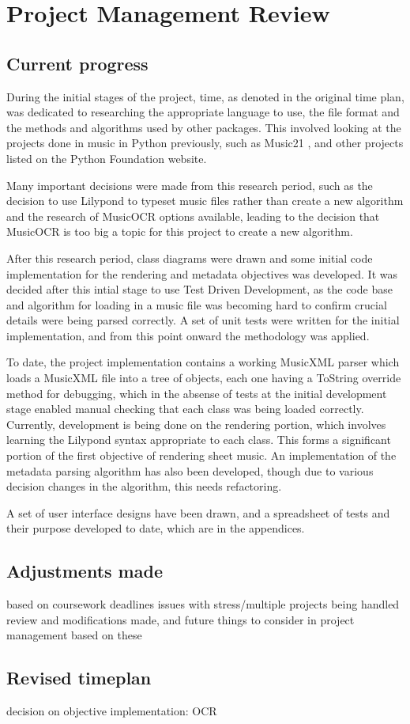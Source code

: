 \section{Project Management Review}
\subsection{Current progress}
During the initial stages of the project, time, as denoted in the original time plan, was dedicated to researching the appropriate language to use, the file format and the methods and algorithms used by other packages. This involved looking at the projects done in music in Python previously, such as Music21 \parencite{Music21}, and other projects listed on the Python Foundation website\parencite{pmus}. 

Many important decisions were made from this research period, such as the decision to use Lilypond to typeset music files rather than create a new algorithm and the research of MusicOCR options available, leading to the decision that MusicOCR is too big a topic for this project to create a new algorithm.

After this research period, class diagrams were drawn and some initial code implementation for the rendering and metadata objectives was developed. It was decided after this intial stage to use Test Driven Development, as the code base and algorithm for loading in a music file was becoming hard to confirm crucial details were being parsed correctly. A set of unit tests were written for the initial implementation, and from this point onward the methodology was applied.

To date, the project implementation contains a working MusicXML parser which loads a MusicXML file into a tree of objects, each one having a ToString override method for debugging, which in the absense of tests at the initial development stage enabled manual checking that each class was being loaded correctly. Currently, development is being done on the rendering portion, which involves learning the Lilypond syntax appropriate to each class. This forms a significant portion of the first objective of rendering sheet music.
An implementation of the metadata parsing algorithm has also been developed, though due to various decision changes in the algorithm, this needs refactoring.

A set of user interface designs have been drawn, and a spreadsheet of tests and their purpose developed to date, which are in the appendices.
\subsection{Adjustments made}
based on coursework deadlines
issues with stress/multiple projects being handled
review and modifications made, and future things to consider in project management based on these

\subsection{Revised timeplan}
decision on objective implementation: OCR